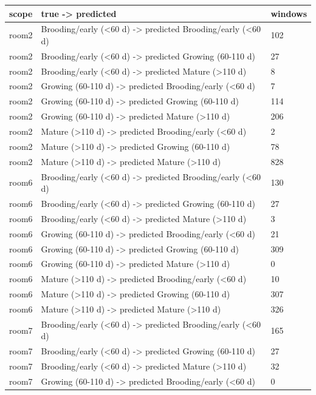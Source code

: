 \begin{tabular}{lll}
\hline
scope & true -> predicted & windows \\
\hline
room2 & Brooding/early (<60 d) -> predicted Brooding/early (<60 d) & 102 \\
room2 & Brooding/early (<60 d) -> predicted Growing (60-110 d) & 27 \\
room2 & Brooding/early (<60 d) -> predicted Mature (>110 d) & 8 \\
room2 & Growing (60-110 d) -> predicted Brooding/early (<60 d) & 7 \\
room2 & Growing (60-110 d) -> predicted Growing (60-110 d) & 114 \\
room2 & Growing (60-110 d) -> predicted Mature (>110 d) & 206 \\
room2 & Mature (>110 d) -> predicted Brooding/early (<60 d) & 2 \\
room2 & Mature (>110 d) -> predicted Growing (60-110 d) & 78 \\
room2 & Mature (>110 d) -> predicted Mature (>110 d) & 828 \\
room6 & Brooding/early (<60 d) -> predicted Brooding/early (<60 d) & 130 \\
room6 & Brooding/early (<60 d) -> predicted Growing (60-110 d) & 27 \\
room6 & Brooding/early (<60 d) -> predicted Mature (>110 d) & 3 \\
room6 & Growing (60-110 d) -> predicted Brooding/early (<60 d) & 21 \\
room6 & Growing (60-110 d) -> predicted Growing (60-110 d) & 309 \\
room6 & Growing (60-110 d) -> predicted Mature (>110 d) & 0 \\
room6 & Mature (>110 d) -> predicted Brooding/early (<60 d) & 10 \\
room6 & Mature (>110 d) -> predicted Growing (60-110 d) & 307 \\
room6 & Mature (>110 d) -> predicted Mature (>110 d) & 326 \\
room7 & Brooding/early (<60 d) -> predicted Brooding/early (<60 d) & 165 \\
room7 & Brooding/early (<60 d) -> predicted Growing (60-110 d) & 27 \\
room7 & Brooding/early (<60 d) -> predicted Mature (>110 d) & 32 \\
room7 & Growing (60-110 d) -> predicted Brooding/early (<60 d) & 0 \\

\end{tabular}
